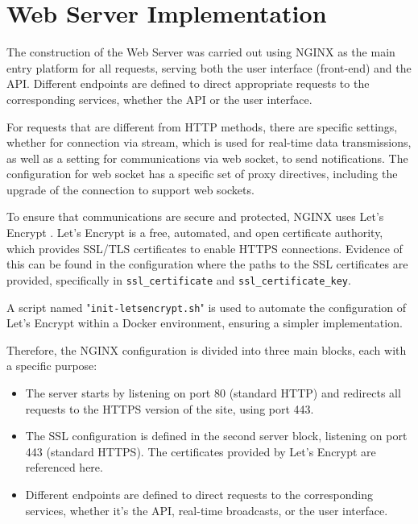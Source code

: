 \section{Web Server Implementation}\label{sec:webserverimpl}
The construction of the Web Server was carried out using NGINX \cite{nginxDocs} as the main entry platform for all requests, serving both the user interface (front-end) and the API. Different endpoints are defined to direct appropriate requests to the corresponding services, whether the API or the user interface.

For requests that are different from HTTP methods, there are specific settings, whether for connection via stream, which is used for real-time data transmissions, as well as a setting for communications via web socket, to send notifications. The configuration for web socket has a specific set of proxy directives, including the upgrade of the connection to support web sockets.


To ensure that communications are secure and protected, NGINX uses Let's Encrypt \cite{letsencrypt2023}. Let's Encrypt is a free, automated, and open certificate authority, which provides SSL/TLS certificates to enable HTTPS connections. Evidence of this can be found in the configuration where the paths to the SSL certificates are provided, specifically in \texttt{ssl\_certificate} and \texttt{ssl\_certificate\_key}.


A script named "\texttt{init-letsencrypt.sh}" is used to automate the configuration of Let's Encrypt within a Docker environment, ensuring a simpler implementation. %

Therefore, the NGINX configuration is divided into three main blocks, each with a specific purpose:

\begin{itemize}
    \item The server starts by listening on port 80 (standard HTTP) and redirects all requests to the HTTPS version of the site, using port 443.
    \item The SSL configuration is defined in the second server block, listening on port 443 (standard HTTPS). The certificates provided by Let's Encrypt are referenced here.
    \item Different endpoints are defined to direct requests to the corresponding services, whether it's the API, real-time broadcasts, or the user interface.
\end{itemize}